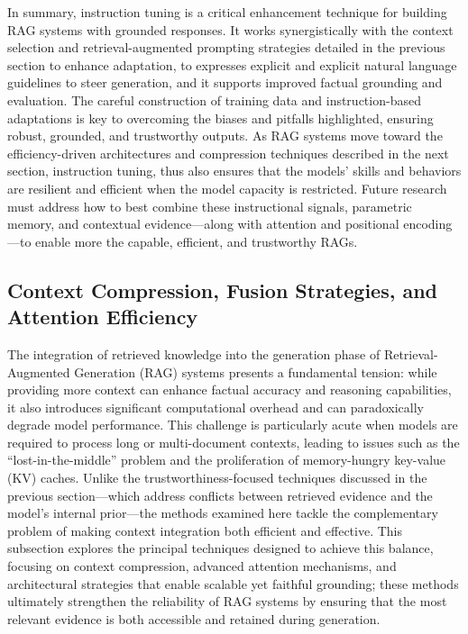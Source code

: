 \documentclass[11pt]{article}
\begin{document}
In summary, instruction tuning is a critical enhancement technique for building RAG systems with grounded responses. It works synergistically with the context selection and retrieval-augmented prompting strategies detailed in the previous section to enhance adaptation, to expresses explicit and explicit natural language guidelines to steer generation, and it supports improved factual grounding and evaluation. The careful construction of training data and instruction-based adaptations is key to overcoming the biases and pitfalls highlighted, ensuring robust, grounded, and trustworthy outputs. As RAG systems move toward the efficiency-driven architectures and compression techniques described in the next section, instruction tuning, thus also ensures that the models' skills and behaviors are resilient and efficient when the model capacity is restricted. Future research must address how to best combine these instructional signals, parametric memory, and contextual evidence---along with attention and positional encoding---to enable more the capable, efficient, and trustworthy RAGs.

\subsection{Context Compression, Fusion Strategies, and Attention Efficiency}

The integration of retrieved knowledge into the generation phase of Retrieval-Augmented Generation (RAG) systems presents a fundamental tension: while providing more context can enhance factual accuracy and reasoning capabilities, it also introduces significant computational overhead and can paradoxically degrade model performance. This challenge is particularly acute when models are required to process long or multi-document contexts, leading to issues such as the ``lost-in-the-middle'' problem and the proliferation of memory-hungry key-value (KV) caches. Unlike the trustworthiness-focused techniques discussed in the previous section---which address conflicts between retrieved evidence and the model's internal prior---the methods examined here tackle the complementary problem of making context integration both efficient and effective. This subsection explores the principal techniques designed to achieve this balance, focusing on context compression, advanced attention mechanisms, and architectural strategies that enable scalable yet faithful grounding; these methods ultimately strengthen the reliability of RAG systems by ensuring that the most relevant evidence is both accessible and retained during generation.
\end{document}
